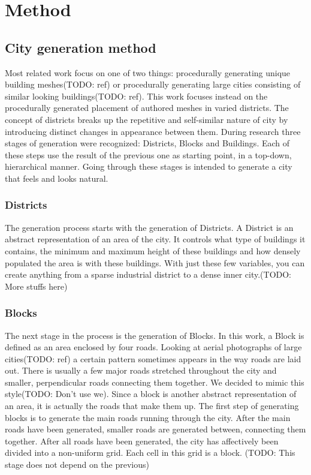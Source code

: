 \section{Method}

	\subsection{City generation method}
	Most related work focus on one of two things: procedurally generating unique building meshes(TODO: ref) or procedurally generating large cities consisting of similar looking buildings(TODO: ref). This work focuses instead on the procedurally generated placement of authored meshes in varied districts. The concept of districts breaks up the repetitive and self-similar nature of city by introducing distinct changes in appearance between them. During research three stages of generation were recognized: Districts, Blocks and Buildings. Each of these steps use the result of the previous one as starting point, in a top-down, hierarchical manner. Going through these stages is intended to generate a city that feels and looks natural.

		\subsubsection{Districts}
		The generation process starts with the generation of Districts. A District is an abstract representation of an area of the city. It controls what type of buildings it contains, the minimum and maximum height of these buildings and how densely populated the area is with these buildings. With just these few variables, you can create anything from a sparse industrial district to a dense inner city.(TODO: More stuffs here)
		
		\subsubsection{Blocks}
		The next stage in the process is the generation of Blocks. In this work, a Block is defined as an area enclosed by four roads. Looking at aerial photographs of large cities(TODO: ref) a certain pattern sometimes appears in the way roads are laid out. There is usually a few major roads stretched throughout the city and smaller, perpendicular roads connecting them together. We decided to mimic this style(TODO: Don't use we). Since a block is another abstract representation of an area, it is actually the roads that make them up. The first step of generating blocks is to generate the main roads running through the city. After the main roads have been generated, smaller roads are generated between, connecting them together. After all roads have been generated, the city has affectively been divided into a non-uniform grid. Each cell in this grid is a block. (TODO: This stage does not depend on the previous)
		
